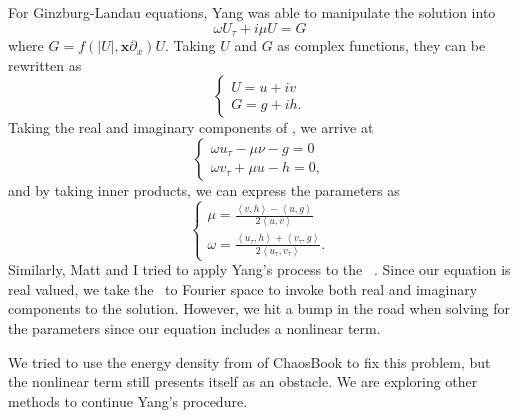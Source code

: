 \begin{description}
{\begin{description}
For Ginzburg-Landau equations, Yang was able to manipulate the solution into
\begin{equation}
    \omega U_{\tau} + i \mu U = G
\end{equation}
where $G = f(|U|,\mathbf{x} \partial_x) U$. Taking $U$ and $G$ as complex functions,
they can be rewritten as
\begin{equation}
    \left\{
    \begin{array}{l}
	U = u + iv\\
	G = g + ih.
    \end{array}
    \right. \label{eq:blogac1}
\end{equation}
Taking the real and imaginary components of , we arrive at
\begin{equation}
    \left\{
    \begin{array}{l}
	\omega u_{\tau} - \mu \nu - g = 0\\
	\omega v_{\tau} + \mu u - h = 0,
    \end{array}
    \right.
\end{equation}
and by taking inner products, we can express the parameters as
\begin{equation}
    \left\{
    \begin{array}{l}
	\mu = \frac{\left< v,h \right> - \left< u,g \right>}{2 \left< u,v \right>}\\
	\omega = \frac{\left< u_{\tau},h \right> + \left< v_{\tau},g \right>}{2 \left< u_{\tau},v_{\tau} \right>}.
    \end{array}
    \right.
\end{equation}
Similarly, Matt and I tried to apply Yang's process to the \KSe\ . Since our equation
is real valued, we take the \KSe\ to Fourier space to invoke both real and imaginary
components to the solution. However, we hit a bump in the road when solving for the
parameters since our equation includes a nonlinear term.

We tried to use the energy density from
 of ChaosBook to fix this
problem, but the nonlinear term still presents itself as an obstacle. We are
exploring other methods to continue Yang's procedure.

\end{description}
}


\end{description}
